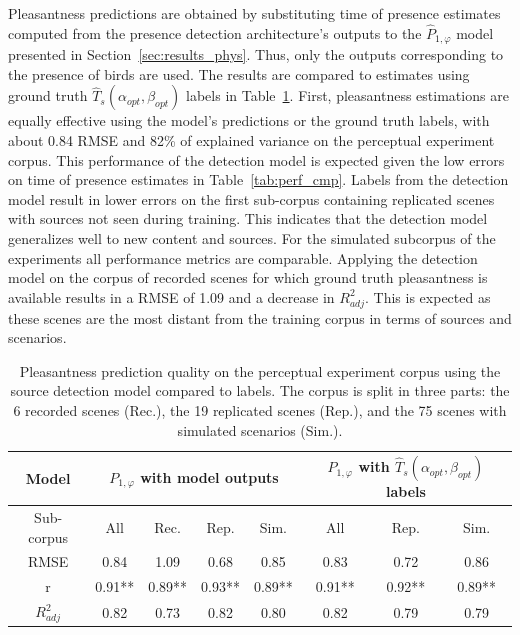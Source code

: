 \documentclass[twocolumn]{article}
\begin{document}
Pleasantness predictions are obtained by substituting time of presence estimates computed from the presence detection architecture's outputs to the $\hat P_{1, \varphi}$ model presented in Section~\ref{sec:results_phys}. Thus, only the outputs corresponding to the presence of birds are used. The results are compared to estimates using ground truth $\hat T_s(\alpha_{opt}, \beta_{opt})$ labels in Table~\ref{tab:pppred}. First, pleasantness estimations are equally effective using the model's predictions or the ground truth labels, with about 0.84 RMSE and 82\% of explained variance on the perceptual experiment corpus. This performance of the detection model is expected given the low errors on time of presence estimates in Table~\ref{tab:perf_cmp}. Labels from the detection model result in lower errors on the first sub-corpus containing replicated scenes with sources not seen during training. This indicates that the detection model generalizes well to new content and sources. For the simulated subcorpus of the experiments all performance metrics are comparable. Applying the detection model on the corpus of recorded scenes for which ground truth pleasantness is available results in a RMSE of 1.09 and a decrease in $R^2_{adj}$. This is expected as these scenes are the most distant from the training corpus in terms of sources and scenarios.

\begin{table}[t]
\centering
\caption{Pleasantness prediction quality on the perceptual experiment corpus using the source detection model compared to labels. The corpus is split in three parts: the 6 recorded scenes (Rec.), the 19 replicated scenes (Rep.), and the 75 scenes with simulated scenarios (Sim.).}
\label{tab:pppred}
\begin{tabular}{ c | c c c c | c c c }
\hline
	Model & \multicolumn{4}{|c}{$P_{1, \varphi}$ with model outputs} & \multicolumn{3}{|c}{$P_{1, \varphi}$ with $\hat T_s(\alpha_{opt}, \beta_{opt})$ labels} \\ \hline
	Sub-corpus & All & Rec. & Rep. & Sim. & All & Rep. & Sim. \\ \hline
	RMSE & 0.84 & 1.09 & 0.68 & 0.85 & 0.83 & 0.72 & 0.86 \\ \hline
	r & 0.91** & 0.89** & 0.93** & 0.89** & 0.91** & 0.92** & 0.89** \\ \hline
	$R^2_{adj}$ & 0.82 & 0.73 & 0.82 & 0.80 & 0.82 & 0.79 & 0.79 \\ \hline
\end{tabular}
\end{table}
\end{document}
